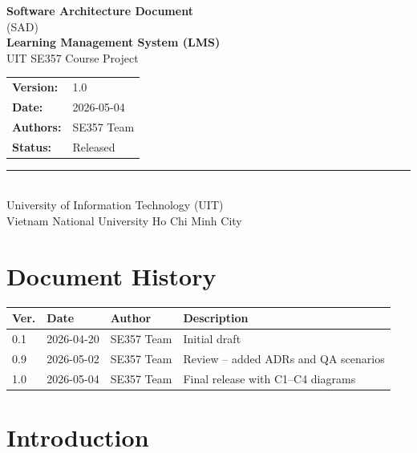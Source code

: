\documentclass[12pt,a4paper]{article}
\begin{document}
\begin{titlepage}
  \centering
  \vspace*{2cm}
  {\Huge\bfseries\color{ecblue} Software Architecture Document}\\[0.5cm]
  {\large\color{ecgray} (SAD)}\\[2cm]
  {\LARGE\bfseries Learning Management System (LMS)}\\[0.5cm]
  {\large UIT SE357 Course Project}\\[2cm]
  \begin{tabular}{ll}
    \textbf{Version:}  & 1.0 \\[4pt]
    \textbf{Date:}     & 2026-05-04 \\[4pt]
    \textbf{Authors:}  & SE357 Team \\[4pt]
    \textbf{Status:}   & Released \\
  \end{tabular}
  \vfill
  \rule{\linewidth}{0.4pt}\\[0.3cm]
  {\small\color{ecgray}
    University of Information Technology (UIT) \\
    Vietnam National University Ho Chi Minh City
  }
\end{titlepage}

\section*{Document History}
\begin{tabularx}{\textwidth}{C{1.5cm} C{2.5cm} L{3cm} L{7cm}}
  \toprule
  \textbf{Ver.} & \textbf{Date} & \textbf{Author} & \textbf{Description} \\
   & 2026-04-20 & SE357 Team & Initial draft \\
  0.9 & 2026-05-02 & SE357 Team & Review -- added ADRs and QA scenarios \\
  1.0 & 2026-05-04 & SE357 Team & Final release with C1--C4 diagrams \\
  \bottomrule
\end{tabularx}

\clearpage
\tableofcontents
\clearpage

\section{Introduction}
\end{document}
